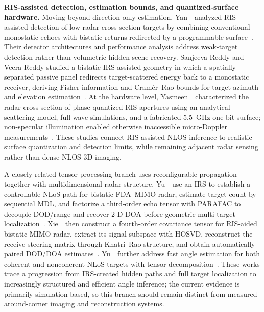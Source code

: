 \vspace{0.8mm}
\noindent \textbf{RIS-assisted detection, estimation bounds, and quantized-surface hardware.}
Moving beyond direction-only estimation, Yan~\etal~analyzed RIS-assisted detection of low-radar-cross-section targets by combining conventional monostatic echoes with bistatic returns redirected by a programmable surface~\cite{coloneRISAidedDetection2026}. Their detector architectures and performance analysis address weak-target detection rather than volumetric hidden-scene recovery. Sanjeeva Reddy and Veera Reddy studied a bistatic IRS-assisted geometry in which a spatially separated passive panel redirects target-scattered energy back to a monostatic receiver, deriving Fisher-information and Cram\'er--Rao bounds for target azimuth and elevation estimation~\cite{sanjeevaBiStaticIRSCRB2026}. At the hardware level, Yasmeen~\etal~characterized the radar cross section of phase-quantized RIS apertures using an analytical scattering model, full-wave simulations, and a fabricated 5.5~GHz one-bit surface; non-specular illumination enabled otherwise inaccessible micro-Doppler measurements~\cite{yasmeenRCSQuantizedRIS2026}. These studies connect RIS-assisted NLOS inference to realistic surface quantization and detection limits, while remaining adjacent radar sensing rather than dense NLOS 3D imaging.


A closely related tensor-processing branch uses reconfigurable propagation together with multidimensional radar structure. Yu~\etal~use an IRS to establish a controllable NLoS path for bistatic FDA--MIMO radar, estimate target count by sequential MDL, and factorize a third-order echo tensor with PARAFAC to decouple DOD/range and recover 2-D DOA before geometric multi-target localization~\cite{yuIRSFdaMimoNLOS2025}. Xie~\etal~then construct a fourth-order covariance tensor for RIS-aided bistatic MIMO radar, extract its signal subspace with HOSVD, reconstruct the receive steering matrix through Khatri--Rao structure, and obtain automatically paired DOD/DOA estimates~\cite{xieCovarianceTensorRISNLOS2026}. Yu~\etal~further address fast angle estimation for both coherent and noncoherent NLoS targets with tensor decomposition~\cite{yuFastAngleRISNLOS2026}. These works trace a progression from IRS-created hidden paths and full target localization to increasingly structured and efficient angle inference; the current evidence is primarily simulation-based, so this branch should remain distinct from measured around-corner imaging and reconstruction systems.

